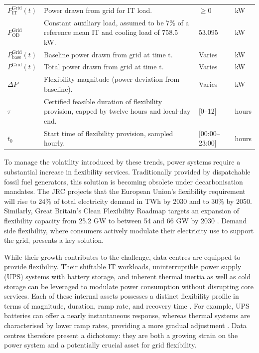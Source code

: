 \documentclass[lettersize,journal]{IEEEtran}
\newcommand{\rev}[1]{#1}
\begin{document}
{{\begin{longtable}{p{} p{} p{} p{}}
$P^{\mathrm{Grid}}_{\mathrm{IT}}(t)$ & Power drawn from grid for IT load. & $\geq 0$ &kW \\
$P^{\mathrm{Grid}}_{\mathrm{OD}}$ & \rev{Constant auxiliary load, assumed to be 7\% of a reference mean IT and cooling load of 758.5 kW.} & $53.095$ &kW \\
$P^{\mathrm{Grid}}_{\mathrm{base}}(t)$ & Baseline power drawn from grid at time t. & Varies &kW \\
$P^{\mathrm{Grid}}(t)$ & Total power drawn from grid at time t. & Varies &kW \\
$\Delta P$ & Flexibility magnitude (power deviation from baseline). & Varies &kW \\
$\tau$ & Certified feasible duration of flexibility provision, capped by twelve hours and local-day end. & [0--12] & hours \\
$t_0$ & Start time of flexibility provision, sampled hourly. & [00:00--23:00] & hours \\
\end{longtable}
\twocolumn
}
} %
To manage the volatility introduced by these trends, power systems require a substantial increase in flexibility services. Traditionally provided by dispatchable fossil fuel generators, this solution is becoming obsolete under decarbonisation mandates. The JRC \cite{koolen2023flexibility} projects that the European Union’s flexibility requirement will rise to 24\% of total electricity demand in TWh by 2030 and to 30\% by 2050. Similarly, Great Britain’s Clean Flexibility Roadmap targets an expansion of flexibility capacity from 25.2 GW to between 54 and 66 GW by 2030 \cite{clean_flexibility_roadmap}. Demand side flexibility, where consumers actively modulate their electricity use to support the grid, presents a key solution.

While their growth contributes to the challenge, data centres are equipped to provide flexibility. Their shiftable IT workloads, uninterruptible power supply (UPS) systems with battery storage, and inherent thermal inertia as well as cold storage can be leveraged to modulate power consumption without disrupting core services. Each of these internal assets possesses a distinct flexibility profile in terms of magnitude, duration, ramp rate, and recovery time \cite{zhang2025unlocking}. For example, UPS batteries can offer a nearly instantaneous response, whereas thermal systems are characterised by lower ramp rates, providing a more gradual adjustment \cite{zhang2025unlocking, alapera2018data}. Data centres therefore present a dichotomy: they are both a growing strain on the power system and a potentially crucial asset for grid flexibility.
\end{document}
